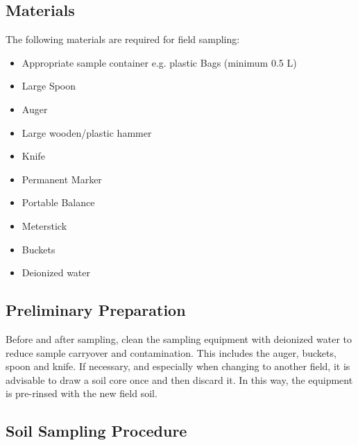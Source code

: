 \begin{refsection}
\subsection*{Materials}

The following materials are required for field sampling:

\begin{itemize}
  \item Appropriate sample container e.g. plastic Bags (minimum 0.5 L) 
  \item Large Spoon
  \item Auger
  \item Large wooden/plastic hammer
  \item Knife
  \item Permanent Marker
  \item Portable Balance
  \item Meterstick
  \item Buckets
  \item Deionized water
\end{itemize}

\subsection*{Preliminary Preparation}

Before and after sampling, clean the sampling equipment with deionized water to reduce sample carryover and contamination. This includes the auger, buckets, spoon and knife. If necessary, and especially when changing to another field, it is advisable to draw a soil core once and then discard it. In this way, the equipment is pre-rinsed with the new field soil.

\subsection*{Soil Sampling Procedure}


\end{refsection}
